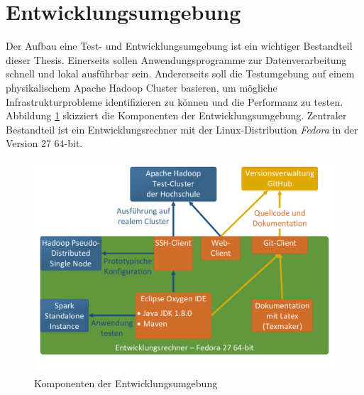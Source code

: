 \clearpage
\section{Entwicklungsumgebung}
\label{development_environment}
Der Aufbau eine Test- und Entwicklungsumgebung ist ein wichtiger Bestandteil dieser Thesis. Einerseits sollen Anwendungsprogramme zur Datenverarbeitung schnell und lokal ausführbar sein. Andererseits soll die Testumgebung auf einem physikalischem Apache Hadoop Cluster basieren, um mögliche Infrastrukturprobleme identifizieren zu können und die Performanz zu testen. \\

\noindent
Abbildung \ref{fig:development_environment} skizziert die Komponenten der Entwicklungsumgebung. Zentraler Bestandteil ist ein Entwicklungsrechner mit der Linux-Distribution \textit{Fedora} in der Version 27 64-bit.

\begin{figure}[ht]
  \centering
  \includegraphics[width=\textwidth]{./resource/development_environment.pdf}
  \caption{Komponenten der Entwicklungsumgebung}
  \label{fig:development_environment}
\end{figure} 

